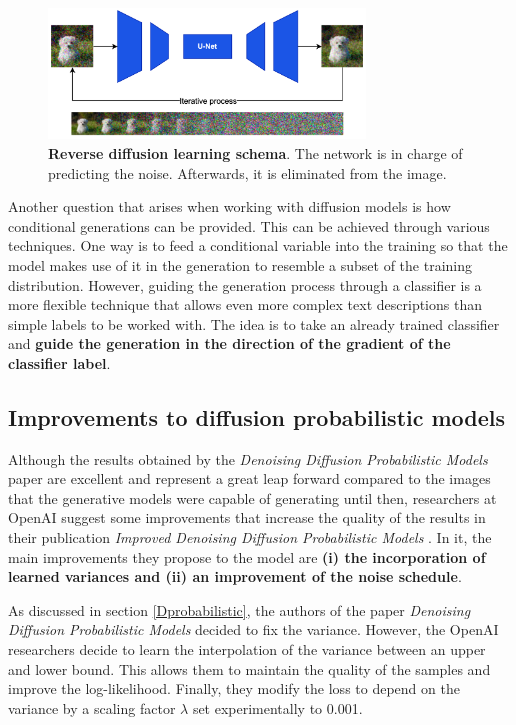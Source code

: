 \begin{figure}
    \centering
    \includegraphics[width=0.75\textwidth]{Pictures/ReverseDP.png} 
    \caption{\textbf{Reverse diffusion learning schema}. The network is in charge of predicting the noise. Afterwards, it is eliminated from the image.}
    \label{fig:ReverseDP}
\end{figure}

Another question that arises when working with diffusion models is how conditional generations can be provided. This can be achieved through various techniques. One way is to feed a conditional variable into the training so that the model makes use of it in the generation to resemble a subset of the training distribution. However, guiding the generation process through a classifier is a more flexible technique that allows even more complex text descriptions than simple labels to be worked with. The idea is to take an already trained classifier and \textbf{guide the generation in the direction of the gradient of the classifier label}.

\subsection{Improvements to diffusion probabilistic models }

Although the results obtained by the \textit{Denoising Diffusion Probabilistic Models} \cite{ho2020denoising} paper are excellent and represent a great leap forward compared to the images that the generative models were capable of generating until then, researchers at OpenAI suggest some improvements that increase the quality of the results in their publication \textit{Improved Denoising Diffusion Probabilistic Models} \cite{nichol2021improved}. In it, the main improvements they propose to the model are \textbf{(i) the incorporation of learned variances and (ii) an improvement of the noise schedule}. 

As discussed in section \ref{Dprobabilistic}, the authors of the paper \textit{Denoising Diffusion Probabilistic Models} \cite{ho2020denoising} decided to fix the variance. However, the OpenAI researchers decide to learn the interpolation of the variance between an upper and lower bound. This allows them to maintain the quality of the samples and improve the log-likelihood. Finally, they modify the loss to depend on the variance by a scaling factor $\lambda$ set experimentally to 0.001.

